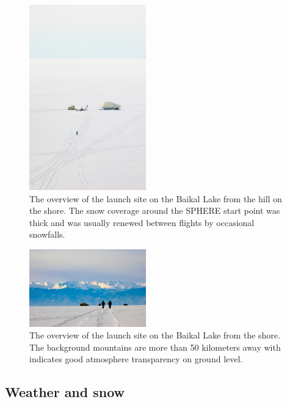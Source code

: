 \documentclass[final,5p,times,twocolumn]{elsarticle}
\begin{document}
\begin{figure}[tb]
\begin{center}
    \includegraphics[trim=1cm 5cm 0cm 5cm,clip,width=0.45\textwidth]{DSC_4049.jpg}\hspace{2pc}%
    \caption{The overview of the launch site on the Baikal Lake from the hill on the shore. The snow coverage around the SPHERE start point was thick and was usually renewed between flights by occasional snowfalls.}
\label{fig:baikal_snow}
\end{center}
\end{figure}
\begin{figure}[tb]
\begin{center}
    \includegraphics[width=0.45\textwidth]{DSC_7423.jpg}\hspace{2pc}%
    \caption{The overview of the launch site on the Baikal Lake from the shore. The background mountains are more than 50 kilometers away with indicates good atmosphere transparency on ground level.}
\label{fig:baikal_atmo}
\end{center}
\end{figure}

\subsection{Weather and snow}
\end{document}
